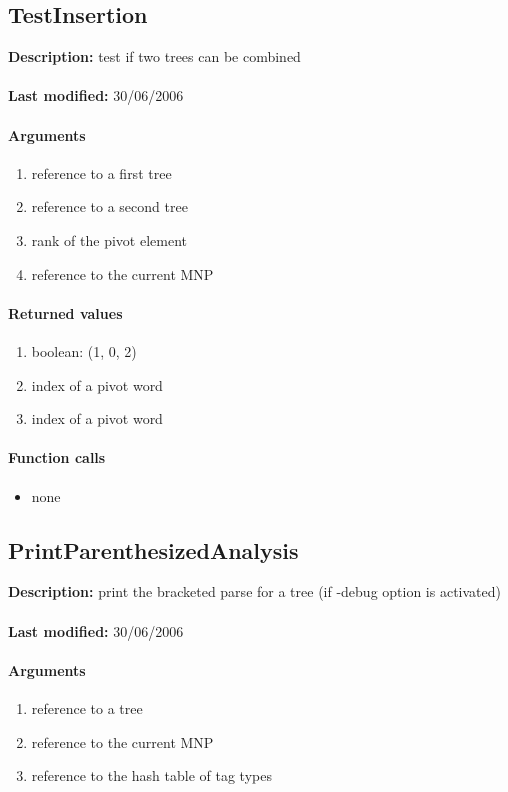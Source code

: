 \subsection{TestInsertion}
\textbf{Description:} test if two trees can be combined\\
\\\textbf{Last modified:} 30/06/2006

\paragraph{Arguments}
\begin{enumerate}
\item reference to a first tree
\item reference to a second tree
\item rank of the pivot element
\item reference to the current MNP
\end{enumerate}

\paragraph{Returned values}
\begin{enumerate}
\item boolean: (1, 0, 2)
\item index of a pivot word
\item index of a pivot word
\end{enumerate}

\paragraph{Function calls}
\begin{itemize}
\item none
\end{itemize}

\subsection{PrintParenthesizedAnalysis}
\textbf{Description:} print the bracketed parse for a tree (if -debug option is activated)\\
\\\textbf{Last modified:} 30/06/2006

\paragraph{Arguments}
\begin{enumerate}
\item reference to a tree
\item reference to the current MNP
\item reference to the hash table of tag types
\end{enumerate}

